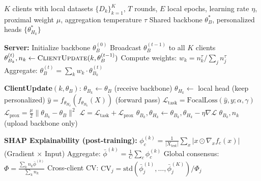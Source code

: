 
\begin{algorithm}[t]
\caption{FedPer-Prox-XAI Training}
\label{alg:fedper_prox_xai}
\begin{algorithmic}[1]
\REQUIRE $K$ clients with local datasets $\{D_k\}_{k=1}^K$,
         $T$ rounds, $E$ local epochs, learning rate $\eta$,
         proximal weight $\mu$, aggregation temperature $\tau$
\ENSURE Shared backbone $\theta_B^*$, personalized heads $\{\theta_{H_k}^*\}$

\STATE \textbf{Server:}
\STATE Initialize backbone $\theta_B^{(0)}$
    \STATE Broadcast $\theta_B^{(t-1)}$ to all $K$ clients
        \STATE $\theta_{B_k}^{(t)}, n_k \leftarrow \textsc{ClientUpdate}(k, \theta_B^{(t-1)})$
    \ENDFOR
    \STATE Compute weights: $w_k = n_k^{\tau} / \sum_j n_j^{\tau}$
    \STATE Aggregate: $\theta_B^{(t)} = \sum_k w_k \cdot \theta_{B_k}^{(t)}$
\ENDFOR

\STATE
\STATE \textbf{ClientUpdate}$(k, \theta_B)$:
\STATE $\theta_{B_k} \leftarrow \theta_B$ \hfill (receive backbone)
\STATE $\theta_{H_k} \leftarrow$ local head \hfill (keep personalized)
        \STATE $\hat{y} = f_{\theta_{H_k}}(f_{\theta_{B_k}}(X))$ \hfill (forward pass)
        \STATE $\mathcal{L}_{\text{task}} = \text{FocalLoss}(\hat{y}, y; \alpha, \gamma)$
        \STATE $\mathcal{L}_{\text{prox}} = \frac{\mu}{2} \|\theta_{B_k} - \theta_B\|^2$
        \STATE $\mathcal{L} = \mathcal{L}_{\text{task}} + \mathcal{L}_{\text{prox}}$
        \STATE $\theta_{B_k}, \theta_{H_k} \leftarrow \theta_{B_k}, \theta_{H_k} - \eta \nabla \mathcal{L}$
    \ENDFOR
\ENDFOR
\RETURN $\theta_{B_k}, n_k$ \hfill (upload backbone only)

\STATE
\STATE \textbf{SHAP Explainability (post-training):}
        \STATE $\phi_c^{(k)} = \frac{1}{|X_{\text{test}}|} \sum_{x} |x \odot \nabla_x f_c(x)|$ \hfill (Gradient $\times$ Input)
    \ENDFOR
    \STATE Aggregate: $\bar{\phi}^{(k)} = \frac{1}{C} \sum_c \phi_c^{(k)}$
\ENDFOR
\STATE Global consensus: $\Phi = \frac{\sum_k n_k \bar{\phi}^{(k)}}{\sum_k n_k}$
\STATE Cross-client CV: $\text{CV}_j = \text{std}(\bar{\phi}_j^{(1)}, \ldots, \bar{\phi}_j^{(K)}) / \Phi_j$
\end{algorithmic}
\end{algorithm}
